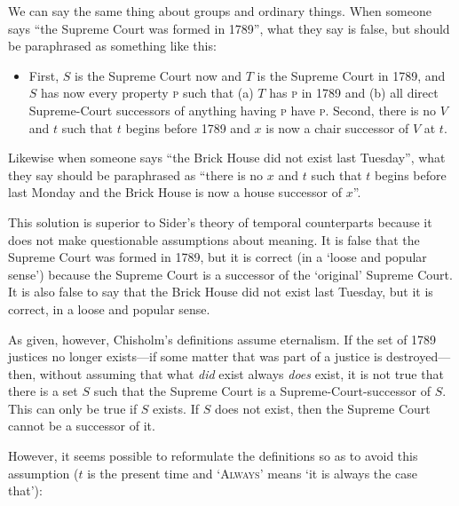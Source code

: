\documentclass[11pt]{article}
\begin{document}
\begin{spacing}{1.5}
We can say the same thing about groups and ordinary things.  When
someone says ``the Supreme Court was formed in 1789'', what they say
is false, but should be paraphrased as something like this:

\begin{itemize}
  \item First, $S$ is the Supreme Court now and $T$ is the Supreme
    Court in 1789, and $S$ has now every property \textsc{p} such that
    (a) $T$ has \textsc{p} in 1789 and (b) all direct Supreme-Court
    successors of anything having \textsc{p} have \textsc{p}.  Second,
    there is no $V$ and $t$ such that $t$ begins before 1789 and $x$
    is now a chair successor of $V$ at $t$.
\end{itemize}

Likewise when someone says ``the Brick House did not exist last
Tuesday'', what they say should be paraphrased as ``there is no $x$
and $t$ such that $t$ begins before last Monday and the Brick House is
now a house successor of $x$''.

This solution is superior to Sider's theory of temporal counterparts
because it does not make questionable assumptions about meaning.  It
is false that the Supreme Court was formed in 1789, but it is correct
(in a `loose and popular sense') because the Supreme Court is a
successor of the `original' Supreme Court.  It is also false to say
that the Brick House did not exist last Tuesday, but it is correct, in
a loose and popular sense.

As given, however, Chisholm's definitions assume eternalism.  If the
set of 1789 justices no longer exists---if some matter that was part
of a justice is destroyed---then, without assuming that what {\em did}
exist always {\em does} exist, it is not true that there is a set $S$
such that the Supreme Court is a Supreme-Court-successor of $S$.  This
can only be true if $S$ exists.  If $S$ does not exist, then the
Supreme Court cannot be a successor of it.

However, it seems possible to reformulate the definitions so as to
avoid this assumption ($t$ is the present time and `\textsc{Always}'
means `it is always the case that'):


\end{spacing}
\end{document}
